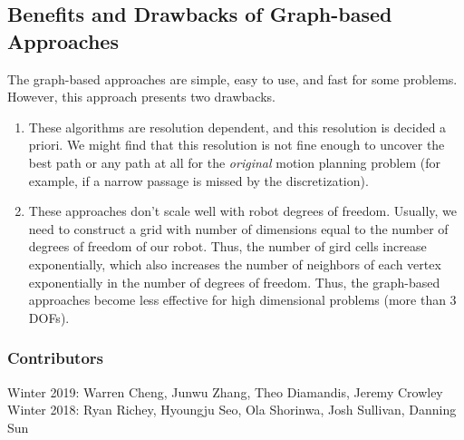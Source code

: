 \documentclass[twoside]{article}
\begin{document}
\subsection{Benefits and Drawbacks of Graph-based Approaches}
The graph-based approaches are simple, easy to use, and fast for some problems. However, this approach presents two drawbacks.
\begin{enumerate}
\item These algorithms are resolution dependent, and this resolution is decided a priori. We might find that this resolution is not fine enough to uncover the best path or any path at all for the \textit{original} motion planning problem (for example, if a narrow passage is missed by the discretization).
\item These approaches don't scale well with robot degrees of freedom. Usually, we need to construct a grid with number of dimensions equal to the number of degrees of freedom of our robot. Thus, the number of gird cells increase exponentially, which also increases the number of neighbors of each vertex exponentially in the number of degrees of freedom. Thus, the graph-based approaches become less effective for high dimensional problems (more than 3 DOFs).
\end{enumerate}




\printbibliography

\subsubsection*{Contributors}
Winter 2019: Warren Cheng,  Junwu Zhang, Theo Diamandis, Jeremy Crowley\\
Winter 2018: Ryan Richey, Hyoungju Seo, Ola Shorinwa, Josh Sullivan, Danning Sun
\end{document}
